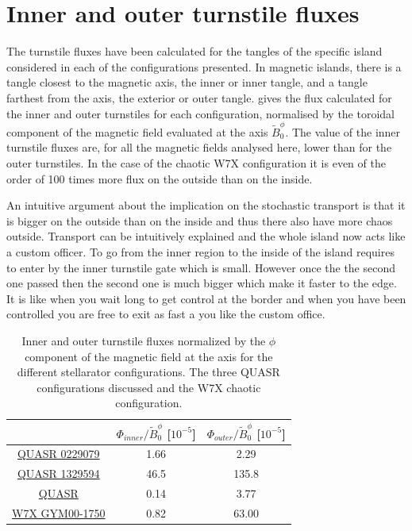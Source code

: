 \section{Inner and outer turnstile fluxes}

The turnstile fluxes have been calculated for the tangles of the specific island considered in each of the configurations presented. In magnetic islands, there is a tangle closest to the magnetic axis, the inner or inner tangle, and a tangle farthest from the axis, the exterior or outer tangle.  gives the flux calculated for the inner and outer turnstiles for each configuration, normalised by the toroidal component of the magnetic field evaluated at the axis $\tilde{B}_0^\phi$. The value of the inner turnstile fluxes are, for all the magnetic fields analysed here, lower than for the outer turnstiles. In the case of the chaotic W7X configuration it is even of the order of 100 times more flux on the outside than on the inside.

An intuitive argument about the implication on the stochastic transport is that it is bigger on the outside than on the inside and thus there also have more chaos outside. Transport can be intuitively explained and the whole island now acts like a custom officer. To go from the inner region to the inside of the island requires to enter by the inner turnstile gate which is small. However once the the second one passed then the second one is much bigger which make it faster to the edge. It is like when you wait long to get control at the border and when you have been controlled you are free to exit as fast a you like the custom office.

\begin{table}[H]
    \centering
    \begin{tabular}{c|c|c}
        & $\Phi_{inner}/\tilde{B}_0^\phi$ [$10^{-5}$] & $\Phi_{outer}/\tilde{B}_0^\phi$ [$10^{-5}$]\\ 
        \hline \hyperref[sec:quars-0229079]{QUASR 0229079} & 1.66 & 2.29\\
        \hline \hyperref[sec:quars-0928241]{QUASR 1329594} & 46.5 & 135.8\\
        \hline \hyperref[sec:quars-1329594]{QUASR} & 0.14 & 3.77\\
        \hline \hyperref[sec:w7x]{W7X GYM00-1750} & 0.82 & 63.00\\
    \end{tabular}
    \caption{Inner and outer turnstile fluxes normalized by the $\phi$ component of the magnetic field at the axis for the different stellarator configurations. The three QUASR configurations discussed and the W7X chaotic configuration.}
    \label{tab:inner-outer-fluxes}
\end{table}